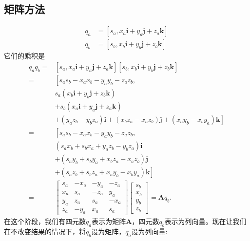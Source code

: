 \subsection{矩阵方法}
$$
\begin{aligned}
q_{a} & =\left[s_{a}, x_{a} \mathbf{i}+y_{a} \mathbf{j}+z_{a} \mathbf{k}\right] \\
q_{b} & =\left[s_{b}, x_{b} \mathbf{i}+y_{b} \mathbf{j}+z_{b} \mathbf{k}\right]
\end{aligned}
$$
它们的乘积是
$$
\begin{aligned}
q_{a} q_{b}=&\left[s_{a}, x_{a} \mathbf{i}+y_{a} \mathbf{j}+z_{a} \mathbf{k}\right]\left[s_{b}, x_{b} \mathbf{i}+y_{b} \mathbf{j}+z_{b} \mathbf{k}\right] \\
=&\left[s_{a} s_{b}-x_{a} x_{b}-y_{a} y_{b}-z_{a} z_{b},\right. \\
& s_{a}\left(x_{b} \mathbf{i}+y_{b} \mathbf{j}+z_{b} \mathbf{k}\right) \\
& +s_{b}\left(x_{a} \mathbf{i}+y_{a} \mathbf{j}+z_{a} \mathbf{k}\right) \\
& \left.+\left(y_{a} z_{b}-y_{b} z_{a}\right) \mathbf{i}+\left(x_{b} z_{a}-x_{a} z_{b}\right) \mathbf{j}+\left(x_{a} y_{b}-x_{b} y_{a}\right) \mathbf{k}\right] \\
=&\left[s_{a} s_{b}-x_{a} x_{b}-y_{a} y_{b}-z_{a} z_{b}\right. \text {, } \\
& \left(s_{a} x_{b}+s_{b} x_{a}+y_{a} z_{b}-y_{b} z_{a}\right) \mathbf{i} \\
& +\left(s_{a} y_{b}+s_{b} y_{a}+x_{b} z_{a}-x_{a} z_{b}\right) \mathbf{j} \\
& \left.+\left(s_{a} z_{b}+s_{b} z_{a}+x_{a} y_{b}-x_{b} y_{a}\right) \mathbf{k}\right] \\
=&\begin{bmatrix}s_{a} & -x_{a} & -y_{a} & -z_{a} \\x_{a} & s_{a} & -z_{a} & y_{a} \\y_{a} & z_{a} & s_{a} & -x_{a} \\z_{a} & -y_{a} & x_{a} & s_{a}\end{bmatrix}\begin{bmatrix}s_{b} \\x_{b} \\y_{b} \\z_{b}\end{bmatrix}=\mathbf{A} q_{b} .
\end{aligned}
$$
在这个阶段，我们有四元数$q_{a}$表示为矩阵$\mathbf{A}$，四元数$q_{b}$表示为列向量。现在让我们在不改变结果的情况下，将$q_{b}$设为矩阵，$q_{a}$设为列向量:
